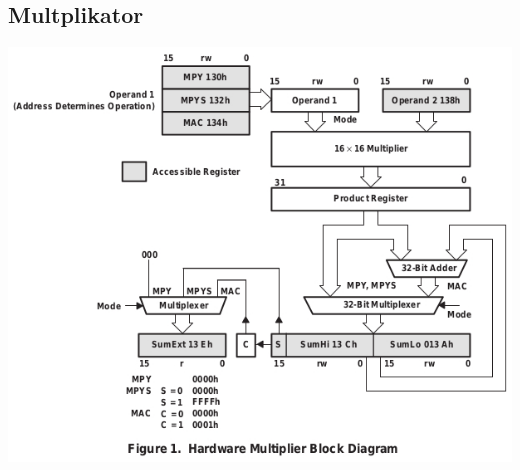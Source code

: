 \documentclass{beamer}
\begin{document}
\subsection{Multplikator}
\begin{frame}
\includegraphics[scale=0.64,center]{MSP430_mult_dia.jpg}
\end{frame}
\end{document}
